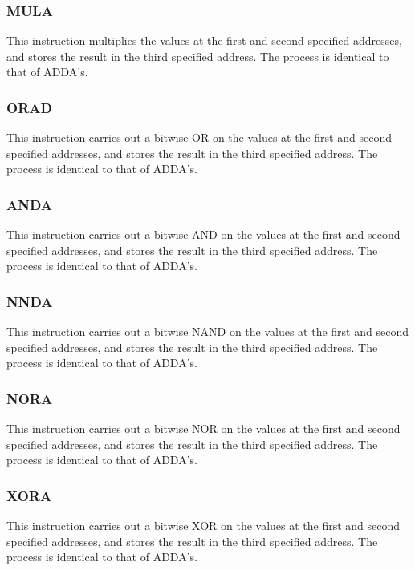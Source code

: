 \documentclass[a4paper,11pt]{article}
\begin{document}
        \subsubsection{MULA}
            This instruction multiplies the values at the first and second specified addresses, and stores the result in the third specified address. The process is identical to that of ADDA's.
            
        \subsubsection{ORAD}
            This instruction carries out a bitwise OR on the values at the first and second specified addresses, and stores the result in the third specified address. The process is identical to that of ADDA's.
            
        \subsubsection{ANDA}
            This instruction carries out a bitwise AND on the values at the first and second specified addresses, and stores the result in the third specified address. The process is identical to that of ADDA's.
            
        \subsubsection{NNDA}
            This instruction carries out a bitwise NAND on the values at the first and second specified addresses, and stores the result in the third specified address. The process is identical to that of ADDA's.
            
        \subsubsection{NORA}
            This instruction carries out a bitwise NOR on the values at the first and second specified addresses, and stores the result in the third specified address. The process is identical to that of ADDA's.
            
        \subsubsection{XORA}
            This instruction carries out a bitwise XOR on the values at the first and second specified addresses, and stores the result in the third specified address. The process is identical to that of ADDA's.
            
\end{document}
